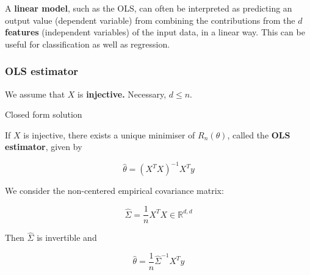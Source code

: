 \documentclass[
10pt, %
a4paper, %
oneside, %
headinclude,footinclude, %
BCOR5mm, %
]{scrartcl}
\begin{document}
\begin{remark}
    A \textbf{{linear model}}, such as the OLS, can often be interpreted as
    predicting an output value (dependent variable) from combining the contributions from the $d$
    \textbf{{features}} (independent variables) of the input data, in a linear
    way. This can be useful for classification as well as regression.
\end{remark}

\subsubsection{\large\color{Periwinkle}OLS estimator}

We assume that $X$ is \textbf{{injective.}}  Necessary, $d\leq n$.

\begin{proposition}{Closed form solution}
    
    If $X$ is injective, there exists a unique minimiser of $R_n(\theta)$, called the \textbf{{OLS estimator}}, given by

    \begin{equation}
	\label{def:ols}
	\hat{ \theta}= (X^TX)^{-1}X^Ty
    \end{equation}
\end{proposition}

\begin{remark}

    We consider the non-centered empirical covariance matrix:

    \begin{equation}
	\label{eq:Sigma}
	\hat{\Sigma} = \frac{1}{n} X^TX\in \mathbb{R}^{d, d}
    \end{equation}

    Then $ \hat{\Sigma}$ is invertible and

    \begin{equation}
	\hat{\theta} = \frac{1}{n} \hat{\Sigma}^{-1} X^Ty
    \end{equation}
    
\end{remark}
\end{document}
